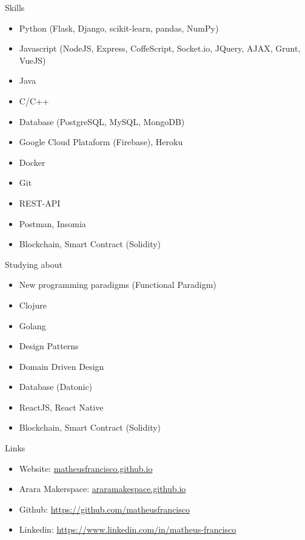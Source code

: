 \documentclass[]{mcdowellcv}
\begin{document}
	\begin{cvsection}{Skills}
		\begin{cvsubsection}{}{}{}
			\begin{itemize}
				\item Python (Flask, Django, scikit-learn, pandas, NumPy)
				\item Javascript (NodeJS, Express, CoffeScript, Socket.io, JQuery, AJAX, Grunt, VueJS)
				\item Java
				\item C/C++
				\item Database (PostgreSQL, MySQL, MongoDB)
				\item Google Cloud Plataform (Firebase), Heroku
				\item Docker
				\item Git
				\item REST-API
				\item Postman, Insomia
				\item Blockchain, Smart Contract (Solidity)
			\end{itemize}
		\end{cvsubsection}
	\end{cvsection}
	\begin{cvsection}{Studying about}
		\begin{cvsubsection}{}{}{}
			\begin{itemize}
        \item New programming paradigms (Functional Paradigm)
				\item Clojure
				\item Golang
				\item Design Patterns
				\item Domain Driven Design
				\item Database (Datonic)
				\item ReactJS, React Native
				\item Blockchain, Smart Contract (Solidity)
			\end{itemize}
		\end{cvsubsection}
	\end{cvsection}

	\begin{cvsection}{Links}
		\begin{cvsubsection}{}{}{}
			\begin{itemize}
				\item Website: \url{matheusfrancisco.github.io}
				\item Arara Makerspace:  \url{araramakespace.github.io}
				\item Github: \url{https://github.com/matheusfrancisco}
				\item Linkedin: \url{https://www.linkedin.com/in/matheus-francisco} 
			\end{itemize}
		\end{cvsubsection}
	\end{cvsection}
	
\end{document}
